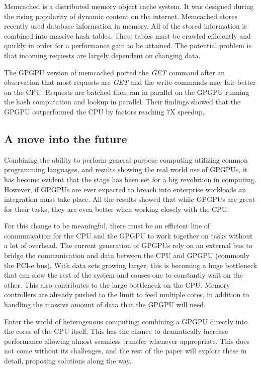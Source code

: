 Memcached is a distributed memory object cache system. It was designed during the rising popularity of dynamic content on the internet. Memcached stores recently used database information in memory. All of the stored information is combined into massive hash tables. These tables must be crawled efficiently and quickly in order for a performance gain to be attained. The potential problem is that incoming requests are largely dependent on changing data. 

The GPGPU version of memcached ported the \textit{GET} command after an observation that most requests are \textit{GET} and the write commands may fair better on the CPU. Requests are batched then ran in parallel on the GPGPU running the hash computation and lookup in parallel. Their findings showed that the GPGPU outperformed the CPU by factors reaching 7X speedup. \cite{memcached}


\subsection*{A move into the future}

Combining the ability to perform general purpose computing utilizing common programming languages, and results showing the real world use of GPGPUs, it has become evident that the stage has been set for a big revolution in computing. However, if GPGPUs are ever expected to breach into enterprise workloads an integration must take place. All the results showed that while GPGPUs are great for their tasks, they are even better when working closely with the CPU. 

For this change to be meaningful, there must be an efficient line of communication for the CPU and the GPGPU to work together on tasks without a lot of overhead. The current generation of GPGPUs rely on an external bus to bridge the communication and data between the CPU and GPGPU (commonly the PCI-e bus). With data sets growing larger, this is becoming a huge bottleneck that can slow the rest of the system and causes one to constantly wait on the other. This also contributes to the large bottleneck on the CPU. Memory controllers are already pushed to the limit to feed multiple cores, in addition to handling the massive amount of data that the GPGPU will need.

Enter the world of heterogenous computing; combining a GPGPU directly into the cores of the CPU itself. This has the chance to dramatically increase performance allowing almost seamless transfer whenever appropriate. This does not come without its challenges, and the rest of the paper will explore these in detail, proposing solutions along the way. 












